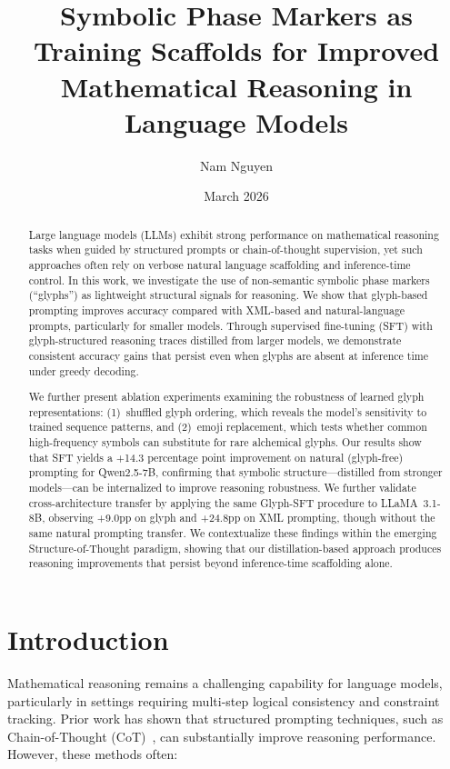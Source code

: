 \documentclass[11pt]{article}
\title{Symbolic Phase Markers as Training Scaffolds for Improved Mathematical Reasoning in Language Models}
\author{Nam Nguyen}
\date{March 2026}
\begin{document}
\maketitle

\begin{abstract}
Large language models (LLMs) exhibit strong performance on mathematical reasoning tasks when guided by structured prompts or chain-of-thought supervision, yet such approaches often rely on verbose natural language scaffolding and inference-time control. In this work, we investigate the use of non-semantic symbolic phase markers (``glyphs'') as lightweight structural signals for reasoning. We show that glyph-based prompting improves accuracy compared with XML-based and natural-language prompts, particularly for smaller models. Through supervised fine-tuning (SFT) with glyph-structured reasoning traces distilled from larger models, we demonstrate consistent accuracy gains that persist even when glyphs are absent at inference time under greedy decoding.

We further present ablation experiments examining the robustness of learned glyph representations: (1)~shuffled glyph ordering, which reveals the model's sensitivity to trained sequence patterns, and (2)~emoji replacement, which tests whether common high-frequency symbols can substitute for rare alchemical glyphs. Our results show that SFT yields a +14.3 percentage point improvement on natural (glyph-free) prompting for Qwen2.5-7B, confirming that symbolic structure---distilled from stronger models---can be internalized to improve reasoning robustness. We further validate cross-architecture transfer by applying the same Glyph-SFT procedure to LLaMA~3.1-8B, observing +9.0pp on glyph and +24.8pp on XML prompting, though without the same natural prompting transfer. We contextualize these findings within the emerging Structure-of-Thought paradigm, showing that our distillation-based approach produces reasoning improvements that persist beyond inference-time scaffolding alone.
\end{abstract}

\section{Introduction}

Mathematical reasoning remains a challenging capability for language models, particularly in settings requiring multi-step logical consistency and constraint tracking. Prior work has shown that structured prompting techniques, such as Chain-of-Thought (CoT)~\citep{wei2022chain}, can substantially improve reasoning performance. However, these methods often:
\end{document}
